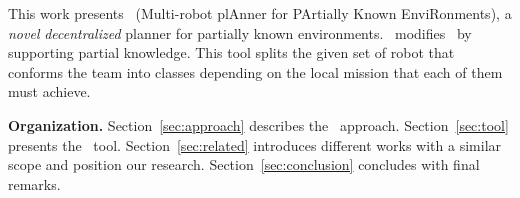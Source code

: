 This work presents  \toolName\ (Multi-robot plAnner for PArtially Known EnviRonments), a \emph{novel} \emph{decentralized} planner for partially known environments.
\toolName\ modifies~\cite{tumova2016multi} by supporting partial knowledge.
This tool splits the given set of robot that conforms the team into classes depending on the local mission that each of them must achieve.


\textbf{Organization.} 
Section~\ref{sec:approach} describes the \toolName\ approach.
Section~\ref{sec:tool} presents the \toolName\ tool.
Section~\ref{sec:related} introduces different works with a similar scope and position our research.
Section~\ref{sec:conclusion} concludes with final remarks.

